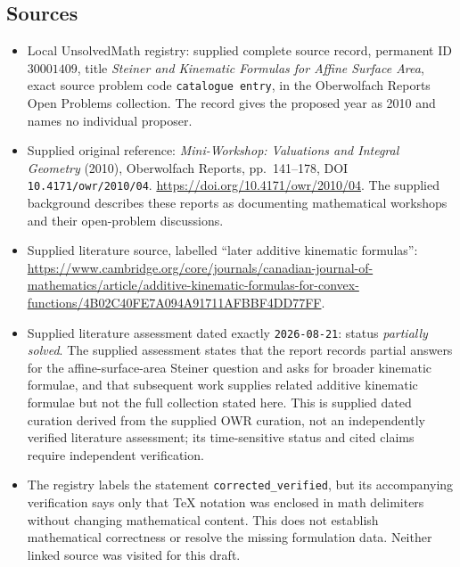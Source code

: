 \documentclass[11pt]{article}
\begin{document}
\subsection{Sources}
\begin{itemize}
\item Local UnsolvedMath registry: supplied complete source record, permanent ID \(30001409\), title \emph{Steiner and Kinematic Formulas for Affine Surface Area}, exact source problem code \texttt{catalogue entry}, in the Oberwolfach Reports Open Problems collection. The record gives the proposed year as 2010 and names no individual proposer.
\item Supplied original reference: \emph{Mini-Workshop: Valuations and Integral Geometry} (2010), Oberwolfach Reports, pp.~141--178, DOI \texttt{10.4171/owr/2010/04}. \url{https://doi.org/10.4171/owr/2010/04}. The supplied background describes these reports as documenting mathematical workshops and their open-problem discussions.
\item Supplied literature source, labelled ``later additive kinematic formulas'': \url{https://www.cambridge.org/core/journals/canadian-journal-of-mathematics/article/additive-kinematic-formulas-for-convex-functions/4B02C40FE7A094A91711AFBBF4DD77FF}.
\item Supplied literature assessment dated exactly \texttt{2026-08-21}: status \emph{partially solved}. The supplied assessment states that the report records partial answers for the affine-surface-area Steiner question and asks for broader kinematic formulae, and that subsequent work supplies related additive kinematic formulae but not the full collection stated here. This is supplied dated curation derived from the supplied OWR curation, not an independently verified literature assessment; its time-sensitive status and cited claims require independent verification.
\item The registry labels the statement \texttt{corrected\_verified}, but its accompanying verification says only that TeX notation was enclosed in math delimiters without changing mathematical content. This does not establish mathematical correctness or resolve the missing formulation data. Neither linked source was visited for this draft.
\end{itemize}
\end{document}

